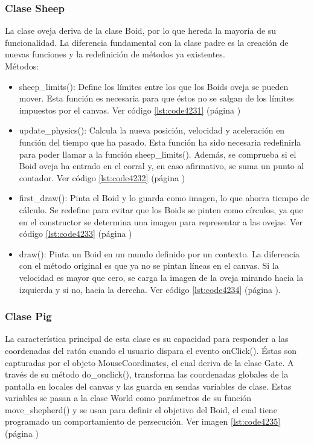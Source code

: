 \subsubsection{Clase Sheep}
\label{subsubsection:sheep}

La clase oveja deriva de la clase Boid, por lo que hereda la mayoría de su funcionalidad. La diferencia fundamental con la clase padre es 
la creación de nuevas funciones y la redefinición de métodos ya existentes.\\

Métodos:
\begin{itemize}
\item sheep\_limits(): Define los límites entre los que los Boids oveja se pueden mover. Esta función es necesaria para que éstos no se 
salgan de los límites impuestos por el canvas. Ver código \ref{lst:code4231} (página \pageref{lst:code4231})

\item  update\_physics(): Calcula la nueva posición, velocidad y aceleración en función del tiempo que ha pasado. Esta función ha sido 
necesaria redefinirla para poder llamar a la función sheep\_limits(). Además, se comprueba si el Boid oveja ha entrado en el corral y, en 
caso afirmativo, se suma un punto al contador. Ver código \ref{lst:code4232} (página \pageref{lst:code4232})

\item  first\_draw():  Pinta el Boid y lo guarda como imagen, lo que ahorra tiempo de cálculo. Se redefine para evitar que los Boids se 
pinten como círculos, ya que en el constructor se determina una imagen para representar a las ovejas. Ver código \ref{lst:code4233} (página \pageref{lst:code4233})

\item  draw(): Pinta un Boid en un mundo definido por un contexto. La diferencia con el método original es que ya no se pintan líneas en 
el canvas. Si la velocidad es mayor que cero, se carga la imagen de la oveja mirando hacia la izquierda y si no, hacia la derecha. 
Ver código \ref{lst:code4234} (página \pageref{lst:code4234}).

\end{itemize}



\subsubsection{Clase Pig}
\label{subsubsection:pig}

La característica principal de esta clase es su capacidad para responder a las coordenadas del ratón cuando el usuario dispara el evento 
onClick(). Éstas son capturadas por el objeto MouseCoordinates, el cual deriva de la clase Gate. A través de su método do\_onclick(), 
transforma las coordenadas globales de la pantalla en locales del canvas y las guarda en sendas variables de clase. Estas variables se 
pasan a la clase World como parámetros de su función move\_shepherd() y se usan para definir el objetivo del Boid, el cual tiene programado un 
comportamiento de persecución. Ver imagen \ref{lst:code4235} (página \pageref{lst:code4235})\\

